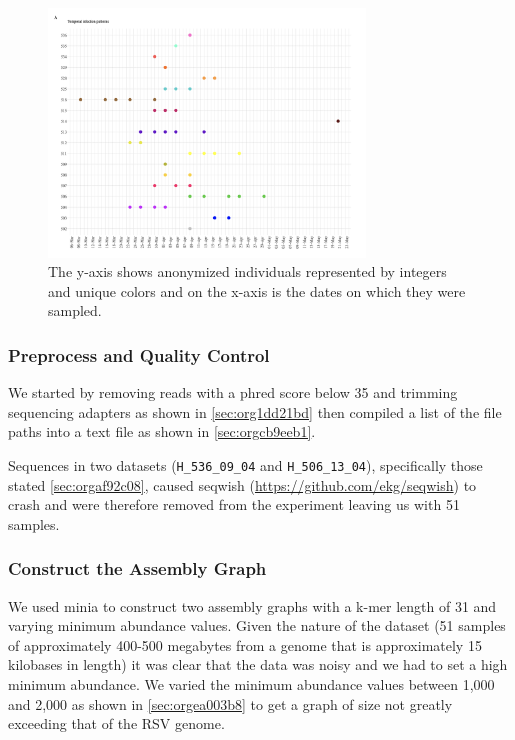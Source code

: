 \documentclass[10pt, a4paper]{article}
\begin{document}
\begin{figure}[h]
\centering
\includegraphics[width=0.75\textwidth]{../Figures/RSV/Githinji_HH_5_temporal_distribution.png}
\caption[Temporal Distribution of RSV Sample Collection]{\label{fig:org77a75e4}
The y-axis shows anonymized individuals represented by integers and unique colors and on the x-axis is the dates on which they were sampled.}
\end{figure}

\subsubsection{Preprocess and Quality Control}
\label{sec:orgdc091a2}
We started by removing reads with a phred score below 35 and trimming sequencing
adapters as shown in \ref{sec:org1dd21bd} then compiled a list 
of the file paths into a text file as shown in \ref{sec:orgcb9eeb1}.

Sequences in two datasets (\texttt{H\_536\_09\_04} and \texttt{H\_506\_13\_04}), specifically those 
stated \ref{sec:orgaf92c08}, caused seqwish
(\url{https://github.com/ekg/seqwish}) to crash and were therefore removed from the 
experiment leaving us with 51 samples.

\subsubsection{Construct the Assembly Graph}
\label{sec:orga5faca7}
We used minia \cite{chikhiSpaceefficientExactBruijn2013} to construct two assembly
graphs with a k-mer length of 31 and varying minimum abundance values.
Given the nature of the dataset (51 samples of approximately 400-500 megabytes 
from a genome that is approximately 15 kilobases in length) it was clear 
that the data was noisy and we had to set a high minimum abundance. 
We varied the minimum abundance values between 1,000 and 2,000 as shown 
in \ref{sec:orgea003b8} to get a graph of size not greatly exceeding that of
the RSV genome.
\end{document}
